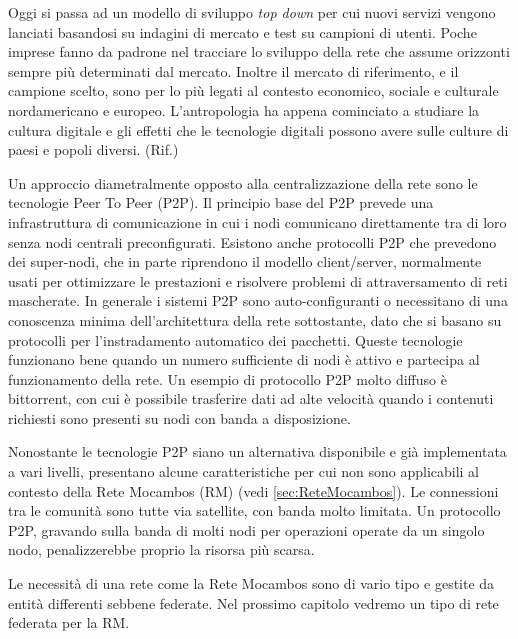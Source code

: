 Oggi si passa ad un modello di sviluppo \emph{top down} per cui nuovi
servizi vengono lanciati basandosi su indagini di mercato e test su
campioni di utenti. Poche imprese fanno da padrone nel tracciare lo
sviluppo della rete che assume orizzonti sempre più determinati dal
mercato. Inoltre il mercato di riferimento, e il campione scelto, sono
per lo più legati al contesto economico, sociale e culturale
nordamericano e europeo. L'antropologia ha appena cominciato a
studiare la cultura digitale e gli effetti che le tecnologie digitali
possono avere sulle culture di paesi e popoli diversi. (Rif.)

Un approccio diametralmente opposto alla centralizzazione della rete
sono le tecnologie Peer To Peer (P2P). Il principio base del P2P
prevede una infrastruttura di comunicazione in cui i nodi comunicano
direttamente tra di loro senza nodi centrali preconfigurati. Esistono
anche protocolli P2P che prevedono dei super-nodi, che in parte
riprendono il modello client/server, normalmente usati per ottimizzare
le prestazioni e risolvere problemi di attraversamento di reti
mascherate. In generale i sistemi P2P sono auto-configuranti o
necessitano di una conoscenza minima dell'architettura della rete
sottostante, dato che si basano su protocolli per l'instradamento
automatico dei pacchetti. Queste tecnologie funzionano bene quando un
numero sufficiente di nodi è attivo e partecipa al funzionamento della
rete. Un esempio di protocollo P2P molto diffuso è bittorrent, con cui
è possibile trasferire dati ad alte velocità quando i contenuti
richiesti sono presenti su nodi con banda a disposizione.

Nonostante le tecnologie P2P siano un alternativa disponibile e già
implementata a vari livelli, presentano alcune caratteristiche per cui
non sono applicabili al contesto della Rete Mocambos (RM)
(vedi \ref{sec:ReteMocambos}). Le connessioni tra le comunità sono tutte via
satellite, con banda molto limitata. Un protocollo P2P, gravando sulla
banda di molti nodi per operazioni operate da un singolo nodo,
penalizzerebbe proprio la risorsa più scarsa.

Le necessità di una rete come la Rete Mocambos sono di vario tipo e gestite da
entità differenti sebbene federate. Nel prossimo capitolo vedremo un
tipo di rete federata per la RM. 

